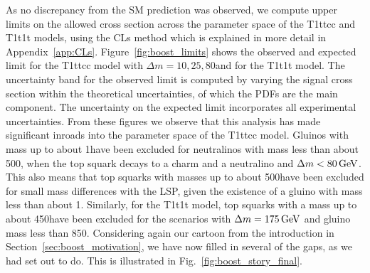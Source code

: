 
As no discrepancy from the SM prediction was observed, we compute upper limits on the allowed
cross section across the parameter space of the T1ttcc and T1t1t models, using the CLs method which
is explained in more detail in Appendix~\ref{app:CLs}. 
Figure~\ref{fig:boost_limits} shows the observed and expected limit for the T1ttcc model with
$\Delta m=10,25,80$\GeV and for the T1t1t model. 
The uncertainty band for the observed limit is computed by varying the signal cross section within
the theoretical uncertainties, of which the PDFs are the main component. The uncertainty on the
expected limit incorporates all experimental uncertainties. 
From these figures we observe that this analysis has made significant inroads into the parameter
space of the T1ttcc model. 
Gluinos with mass up to about 1\TeV have been excluded for neutralinos with mass less than about
500\GeV, when the top squark decays to a charm and a neutralino and $\Delta m < 80\,\text{Ge\hspace{-.08em}V}$. This also
means that top squarks with masses up to about 500\GeV have been excluded for small mass
differences with the LSP, given the existence of a gluino with mass less than about 1\TeV. 
Similarly, for the T1t1t model, top squarks with a mass up to about 450\GeV have been excluded
for the scenarios with $\Delta m = 175\,\text{Ge\hspace{-.08em}V}$ and gluino mass less than 850\GeV.
Considering again our cartoon from the introduction in Section~\ref{sec:boost_motivation}, we have
now filled in several of the gaps, as we had set out to do. This is illustrated in
Fig.~\ref{fig:boost_story_final}. 

